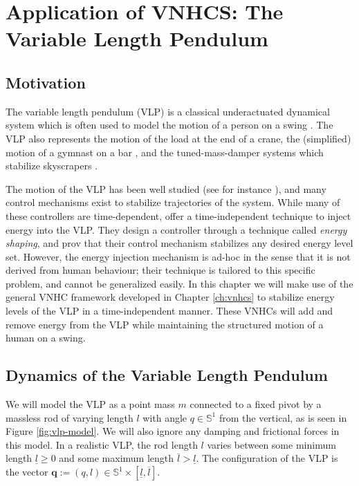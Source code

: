 
\chapter{Application of VNHCS: The Variable Length Pendulum}\label{sec:vlp}
\section{Motivation}
The variable length pendulum (VLP) is a classical underactuated dynamical system
which is often used to model the motion of a person on a swing
\cite{pumping_swing_standing_squatting,how_to_pump_a_swing}.
The VLP also represents the motion of the load at the end of a crane, 
the (simplified) motion of a gymnast on a bar
\cite{pendulum_length_giant_gymnastics}, and the tuned-mass-damper systems which
stabilize skyscrapers \cite{vlp_tuned_mass_damper}.

The motion of the VLP has been well studied (see for instance
\cite{dynamics_periodic_vlp}), and many control mechanisms exist
to stabilize trajectories of the system. While many of these controllers 
are time-dependent, \citet{vlp_energy_shaping}
offer a time-independent technique to inject energy into the VLP. 
They design a controller through a technique called \textit{energy shaping},
and prov that their control mechanism stabilizes any desired energy level set.
However, the energy injection mechanism is ad-hoc in the sense that it is not
derived from human behaviour; their technique is tailored to this specific
problem, and cannot be generalized easily.
In this chapter we will make use of the general VNHC framework developed in Chapter
\ref{ch:vnhcs} to stabilize energy levels of the VLP in a
time-independent manner. 
These VNHCs will add and remove energy from the VLP while maintaining the
structured motion of a human on a swing.

\section{Dynamics of the Variable Length Pendulum}
We will model the VLP as a point mass \(m\)
connected to a fixed pivot by a massless rod of varying length \(l\) with angle 
\(q \in \mathbb{S}^1\) from the vertical, as is seen in Figure
\ref{fig:vlp-model}. 
We will also ignore any damping and frictional forces in this model.
In a realistic VLP, the rod length \(l\) varies between some minimum
length \(\underline{l} \geq 0\) and some maximum length 
\(\overline{l} > \underline{l}\). The configuration of the VLP is the vector
\(\mathbf{q} := (q,l) \in \mathbb{S}^1 \times [\underline{l},\overline{l}]\).

